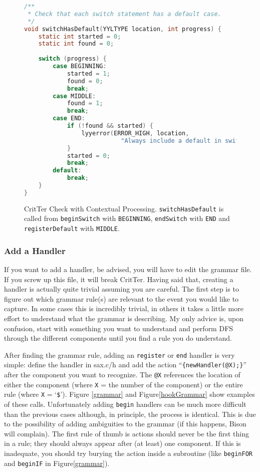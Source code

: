\documentclass[12pt]{report}
\def\lstlistingname{Figure}
\newcommand{\refCode}{\lstlistingname \hspace{1mm}}
\newcommand{\programName}{CritTer\xspace}
\begin{document}
\begin{figure}
\begin{lstlisting}[language=C]
/**
 * Check that each switch statement has a default case.
 */
void switchHasDefault(YYLTYPE location, int progress) {
	static int started = 0;
	static int found = 0;
	
	switch (progress) {
		case BEGINNING:
			started = 1;
			found = 0;
			break;
		case MIDDLE:
			found = 1;
			break;
		case END:
			if (!found && started) {
				lyyerror(ERROR_HIGH, location, 
					       "Always include a default in switch statements");
			}
			started = 0;
			break;
		default: 
			break;
	}
}
\end{lstlisting}
\caption[\programName Check with Contextual Processing]{\programName Check with Contextual Processing. \lstinline{switchHasDefault} is called from \lstinline{beginSwitch} with \lstinline{BEGINNING}, \lstinline{endSwitch} with \lstinline{END} and \lstinline{registerDefault} with \lstinline{MIDDLE}.}
\label{addCheckExample}
\end{figure}

\subsubsection{Add a Handler}

If you want to add a handler, be advised, you will have to edit the grammar file. If you screw up this file, it 
will break \programName. Having said that, creating a handler is actually quite trivial assuming you are 
careful. The first step is to figure out which grammar rule(s) are relevant to the event you would like to 
capture. In some cases this is incredibly trivial, in others it takes a little more effort to understand what the 
grammar is describing. My only advice is, upon confusion, start with something you want to understand 
and perform DFS through the different components until you find a rule you do understand. 

After finding the grammar rule, adding an \lstinline{register} or \lstinline{end} handler is very simple: 
define the handler in sax.c/h and add the action ``\lstinline!{newHandler(@X);}!'' after the component you 
want to recognize. The \lstinline{@X} references the location of either the component (where \lstinline{X} 
= the number of the component) or the entire rule (where \lstinline{X} = `\lstinline{$}'). \refCode 
\ref{grammar} and \refCode \ref{hookGrammar} show examples of these calls. Unfortunately adding 
\lstinline{begin} handlers can be much more difficult than the previous cases although, in principle, the 
process is identical. This is due to the possibility of adding ambiguities to the grammar (if this happens, 
Bison will complain). The first rule of thumb is actions should never be the first thing in a rule; they 
should always appear after (at least) one component. If this is inadequate, you should try burying the 
action inside a subroutine (like \lstinline{beginFOR} and \lstinline{beginIF} in \refCode \ref{grammar}).
\end{document}

